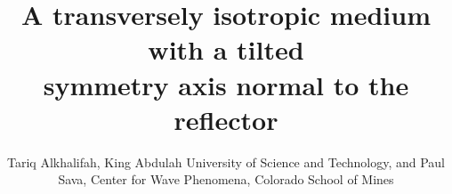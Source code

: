 




\title{A transversely isotropic medium with a tilted \\ symmetry axis normal to the reflector}
\author{
Tariq Alkhalifah, King Abdulah University of Science and Technology, and 
Paul Sava, Center for Wave Phenomena, Colorado School of Mines}
\maketitle











%



